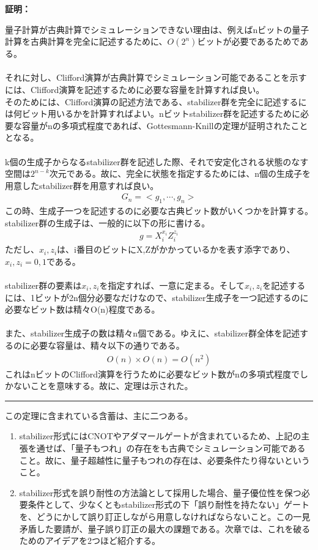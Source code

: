 \documentclass[a4paper,10.5pt]{article}
\numberwithin{equation}{section}
\newenvironment{proofbox}
{\begin{prooflabel}\textbf{証明：}\end{prooflabel}\vspace{0.8em}}
{\par\vspace{1em}\hrule\vspace{1em}}
\begin{document}
\begin{proofbox}
    量子計算が古典計算でシミュレーションできない理由は、例えばnビットの量子計算を古典計算を完全に記述するために、$O(2^{n})$ビットが必要であるためである。\\
    \\
    それに対し、Clifford演算が古典計算でシミュレーション可能であることを示すには、Clifford演算を記述するために必要な容量を計算すれば良い。\\
    そのためには、Clifford演算の記述方法である、stabilizer群を完全に記述するには何ビット用いるかを計算すればよい。nビットstabilizer群を記述するために必要な容量がnの多項式程度であれば、Gottesmann-Knillの定理が証明されたこととなる。\\
    \\
    k個の生成子からなるstabilizer群を記述した際、それで安定化される状態のなす空間は$2^{n-k}$次元である。故に、完全に状態を指定するためには、n個の生成子を用意したstabilizer群を用意すれば良い。
    \begin{align*}
        G_{n}=<g_{1},\cdots ,g_{n}>
    \end{align*}
   この時、生成子一つを記述するのに必要な古典ビット数がいくつかを計算する。stabilizer群の生成子は、一般的に以下の形に書ける。
   \begin{align*}
       g=X_{i}^{x_{i}}Z_{i}^{z_{i}}
   \end{align*}
   ただし、$x_{i},z_{i}$は、i番目のビットにX,Zがかかっているかを表す添字であり、$x_{i},z_{i}=0,1$である。\\
   \\
   stabilizer群の要素は$x_{i},z_{i}$を指定すれば、一意に定まる。そして$x_{i},z_{i}$を記述するには、1ビットが2n個分必要なだけなので、stabilizer生成子を一つ記述するのに必要なビット数は精々O(n)程度である。\\
   \\
   また、stabilizer生成子の数は精々n個である。ゆえに、stabilizer群全体を記述するのに必要な容量は、精々以下の通りである。
   \begin{align*}
       O(n)\times O(n)=O(n^{2})
   \end{align*}
   これはnビットのClifford演算を行うために必要なビット数がnの多項式程度でしかないことを意味する。故に、定理は示された。
\end{proofbox}
この定理に含まれている含蓄は、主に二つある。\\
\begin{enumerate}
    \item stabilizer形式にはCNOTやアダマールゲートが含まれているため、上記の主張を通せば、「量子もつれ」の存在をも古典でシミュレーション可能であること。故に、量子超越性に量子もつれの存在は、必要条件たり得ないということ。
    \item stabilizer形式を誤り耐性の方法論として採用した場合、量子優位性を保つ必要条件として、少なくともstabilizer形式の下「誤り耐性を持たない」ゲートを、どうにかして誤り訂正しながら用意しなければならないこと。この一見矛盾した要請が、量子誤り訂正の最大の課題である。次章では、これを破るためのアイデアを2つほど紹介する。
\end{enumerate}
\end{document}
